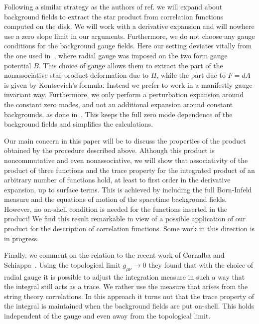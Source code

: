\documentclass[a4paper,12pt]{article}
\begin{document}
Following a similar strategy as the authors of ref. \cite{Cornalba:2001sm}
we will expand about background fields to
extract %
the star product from correlation 
functions computed on the disk. We will work with a derivative expansion 
and will nowhere use a zero slope limit in our arguments.
Furthermore, we do not choose any gauge conditions for the 
background gauge fields. Here our setting deviates vitally from the one 
used in~\cite{Cornalba:2001sm}, where radial gauge was imposed on the two 
form gauge potential $B$. %
This choice of gauge allows them to extract the
part of the nonassociative star product deformation due to 
$H$, while the part due to $F=dA$ is given by Kontsevich's formula. 
Instead we prefer to work in a manifestly gauge invariant way. 
Furthermore, we only perform a perturbation expansion around 
the constant zero modes, and not an additional expansion around constant 
backgrounds, as done in~\cite{Cornalba:2001sm}. This keeps the full zero 
mode dependence of the background fields and simplifies the calculations.

Our main concern in this paper will be to discuss the 
properties of the product obtained by the procedure described above. 
Although this product is noncommutative and even nonassociative, we will 
show that associativity of the product of three functions and the trace
property for the integrated product of an arbitrary number of functions
hold, at least to first order in the derivative expansion,
up to surface 
terms. This is achieved by including the full Born-Infeld measure and  
the equations of motion of the spacetime background fields. However, 
no on-shell condition is needed for the functions inserted in the product! 
We find this result remarkable in view of a possible application of our
product for the description of correlation functions. Some work in this 
direction is in progress. 

Finally, we comment on the relation to the recent work of Cornalba and
Schiappa~\cite{Cornalba:2001sm}. Using the topological limit 
$g_{\mu\nu}\rightarrow 0$ 
they found that with the choice of radial gauge it is possible to adjust the 
integration measure in such a way that the integral still acts as a trace.
We rather use the measure that arises from the string theory correlations.
In this approach it turns out that the trace property of the integral is 
maintained when the background fields are put on-shell. This holds independent
of the gauge and even away from the topological limit.
\end{document}
